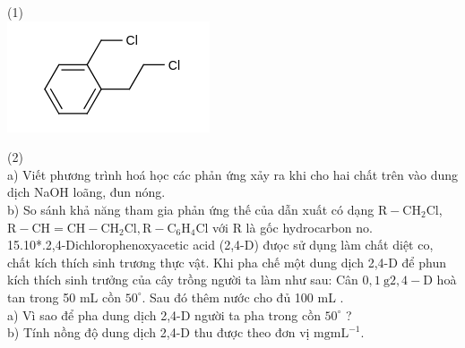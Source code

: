 \documentclass[10pt]{article}
\begin{document}
(1)\\
\includegraphics{smile-b25c950b199b13f9102b4d3307e735af54f11807}

(2)\\
a) Viết phương trình hoá học các phản ứng xảy ra khi cho hai chất trên vào dung dịch NaOH loãng, đun nóng.\\
b) So sánh khả năng tham gia phản ứng thế của dẫn xuất có dạng $\mathrm{R}-\mathrm{CH}_{2} \mathrm{Cl}$, $\mathrm{R}-\mathrm{CH}=\mathrm{CH}-\mathrm{CH}_{2} \mathrm{Cl}, \mathrm{R}-\mathrm{C}_{6} \mathrm{H}_{4} \mathrm{Cl}$ với R là gốc hydrocarbon no.\\
15.10*.2,4-Dichlorophenoxyacetic acid (2,4-D) đưọc sử dụng làm chất diệt co, chất kích thích sinh trương thực vật. Khi pha chế một dung dịch 2,4-D để phun kích thích sinh trưởng của cây trồng người ta làm như sau: Cân $0,1 \mathrm{~g} 2,4-\mathrm{D}$ hoà tan trong 50 mL cồn $50^{\circ}$. Sau đó thêm nước cho đủ 100 mL .\\
a) Vì sao để pha dung dịch 2,4-D người ta pha trong cồn $50^{\circ}$ ?\\
b) Tính nồng độ dung dịch 2,4-D thu được theo đơn vị $\mathrm{mg} \mathrm{mL}^{-1}$.
\end{document}
